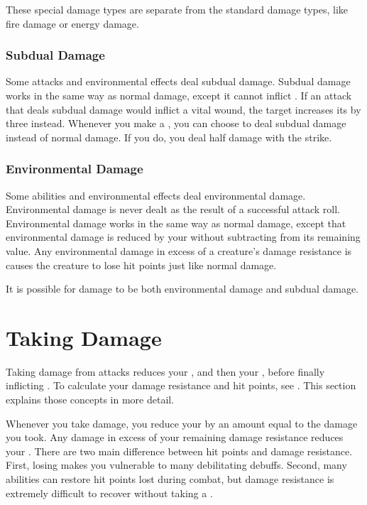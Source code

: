         These special damage types are separate from the standard damage types, like fire damage or energy damage.

        \subsubsection{Subdual Damage}\label{Subdual Damage}
            Some attacks and environmental effects deal subdual damage.
            Subdual damage works in the same way as normal damage, except it cannot inflict .
            If an attack that deals subdual damage would inflict a vital wound, the target increases its  by three instead.
            Whenever you make a , you can choose to deal subdual damage instead of normal damage.
            If you do, you deal half damage with the strike.

        \subsubsection{Environmental Damage}\label{Environmental Damage}
            Some abilities and environmental effects deal environmental damage.
            Environmental damage is never dealt as the result of a successful attack roll.
            Environmental damage works in the same way as normal damage, except that environmental damage is reduced by your  without subtracting from its remaining value.
            Any environmental damage in excess of a creature's damage resistance is causes the creature to lose hit points just like normal damage.

            It is possible for damage to be both environmental damage and subdual damage.

\section{Taking Damage}\label{Taking Damage}
    Taking damage from attacks reduces your , and then your , before finally inflicting .
    To calculate your damage resistance and hit points, see .
    This section explains those concepts in more detail.

    Whenever you take damage, you reduce your  by an amount equal to the damage you took.
    Any damage in excess of your remaining damage resistance reduces your .
    There are two main difference between hit points and damage resistance.
    First, losing  makes you vulnerable to many debilitating debuffs.
    Second, many abilities can restore hit points lost during combat, but damage resistance is extremely difficult to recover without taking a .

